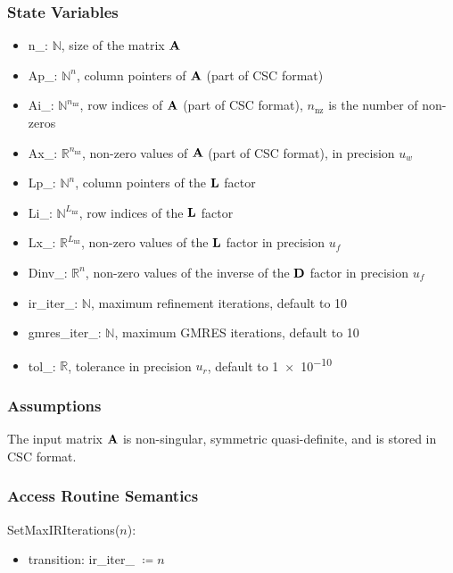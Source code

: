 \documentclass[12pt, titlepage]{article}
\begin{document}
\subsubsection{State Variables}

\begin{itemize}[noitemsep,topsep=0pt,leftmargin=2mm,label={}]
\item n\_: \(\mathbb{N}\), size of the matrix \(\mathbf{A}\)
\item Ap\_: \(\mathbb{N}^n\), column pointers of \(\mathbf{A}\) (part of CSC format)
\item Ai\_: \(\mathbb{N}^{n_\mathrm{nz}}\), row indices of \(\mathbf{A}\) (part of CSC format),
  \(n_\mathrm{nz}\) is the number of non-zeros
\item Ax\_: \(\mathbb{R}^{n_\mathrm{nz}}\), non-zero values of \(\mathbf{A}\) (part of CSC format),
  in precision \(u_w\)
\item Lp\_: \(\mathbb{N}^n\), column pointers of the \(\mathbf{L}\) factor
\item Li\_: \(\mathbb{N}^{L_\mathrm{nz}}\), row indices of the \(\mathbf{L}\) factor
\item Lx\_: \(\mathbb{R}^{L_\mathrm{nz}}\), non-zero values of the \(\mathbf{L}\) factor in precision
  \(u_f\)
\item Dinv\_: \(\mathbb{R}^n\), non-zero values of the inverse of the \(\mathbf{D}\)
  factor in precision \(u_f\)
\item ir\_iter\_: \(\mathbb{N}\), maximum refinement iterations, default to 10
\item gmres\_iter\_: \(\mathbb{N}\), maximum GMRES iterations, default to 10
\item tol\_: \(\mathbb{R}\), tolerance in precision \(u_r\), default to \num{1e-10}
\end{itemize}

\subsubsection{Assumptions}

The input matrix \(\mathbf{A}\) is non-singular, symmetric quasi-definite, and is
stored in CSC format.

\subsubsection{Access Routine Semantics}


\noindent SetMaxIRIterations(\(n\)):
\begin{itemize}
\item transition: ir\_iter\_ \(\coloneq n\)
\end{itemize}
\end{document}
